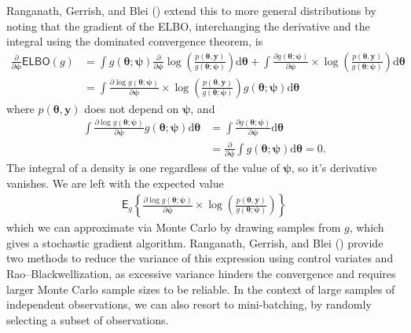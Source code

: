 \documentclass[
  11pt,
  letterpaper,
]{scrbook}
\theoremstyle{plain}
\theoremstyle{definition}
\theoremstyle{definition}
\theoremstyle{plain}
\theoremstyle{plain}
\theoremstyle{definition}
\theoremstyle{remark}
\begin{document}
Ranganath, Gerrish, and Blei ()
extend this to more general distributions by noting that the gradient of
the ELBO, interchanging the derivative and the integral using the
dominated convergence theorem, is \begin{align*}
\frac{\partial}{\partial \boldsymbol{\psi}} \mathsf{ELBO}(g) &= \int g(\boldsymbol{\theta}; \boldsymbol{\psi}) \frac{\partial}{\partial \boldsymbol{\psi}} \log \left( \frac{p(\boldsymbol{\theta}, \boldsymbol{y})}{g(\boldsymbol{\theta}; \boldsymbol{\psi})}\right) \mathrm{d} \boldsymbol{\theta} + \int  \frac{\partial g(\boldsymbol{\theta}; \boldsymbol{\psi})}{\partial \boldsymbol{\psi}} \times \log \left( \frac{p(\boldsymbol{\theta}, \boldsymbol{y})}{g(\boldsymbol{\theta}; \boldsymbol{\psi})}\right) \mathrm{d} \boldsymbol{\theta}
\\& = \int  \frac{\partial \log g(\boldsymbol{\theta}; \boldsymbol{\psi})}{\partial \boldsymbol{\psi}} \times \log \left( \frac{p(\boldsymbol{\theta}, \boldsymbol{y})}{g(\boldsymbol{\theta}; \boldsymbol{\psi})}\right) g(\boldsymbol{\theta}; \boldsymbol{\psi})\mathrm{d} \boldsymbol{\theta}
\end{align*} where \(p(\boldsymbol{\theta}, \boldsymbol{y})\) does not
depend on \(\boldsymbol{\psi}\), and \begin{align*}
\int \frac{\partial \log g(\boldsymbol{\theta}; \boldsymbol{\psi})}{\partial \boldsymbol{\psi}} g(\boldsymbol{\theta}; \boldsymbol{\psi}) \mathrm{d} \boldsymbol{\theta} & = \int \frac{\partial g(\boldsymbol{\theta}; \boldsymbol{\psi})}{\partial \boldsymbol{\psi}} \mathrm{d} \boldsymbol{\theta}  \\&=
\frac{\partial}{\partial \boldsymbol{\psi}}\int g(\boldsymbol{\theta}; \boldsymbol{\psi})  \mathrm{d} \boldsymbol{\theta} = 0.
\end{align*} The integral of a density is one regardless of the value of
\(\boldsymbol{\psi}\), so it's derivative vanishes. We are left with the
expected value \begin{align*}
 \mathsf{E}_{g}\left\{\frac{\partial \log g(\boldsymbol{\theta}; \boldsymbol{\psi})}{\partial \boldsymbol{\psi}} \times \log \left( \frac{p(\boldsymbol{\theta}, \boldsymbol{y})}{g(\boldsymbol{\theta}; \boldsymbol{\psi})}\right)\right\}
\end{align*} which we can approximate via Monte Carlo by drawing samples
from \(g\), which gives a stochastic gradient algorithm. Ranganath,
Gerrish, and Blei () provide two
methods to reduce the variance of this expression using control variates
and Rao--Blackwellization, as excessive variance hinders the convergence
and requires larger Monte Carlo sample sizes to be reliable. In the
context of large samples of independent observations, we can also resort
to mini-batching, by randomly selecting a subset of observations.
\end{document}
